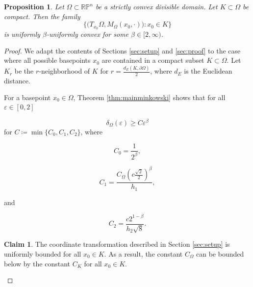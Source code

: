 \documentclass[letterpaper, 11pt, reqno]{amsart}
\newtheorem{prop}[thm]{Proposition}
\theoremstyle{definition}
\newtheorem{claim}[thm]{Claim}
\begin{document}
\begin{prop}Let $\Omega \subset \mathbb{RP}^n$ be a strictly convex divisible domain. Let $K \subset \Omega$ be compact. Then the family 
\begin{equation}
  \biggl\{ \big(T_{x_0}\Omega, M_\Omega(x_0, \cdot)\big): x_0 \in K \biggl\}
\end{equation} is uniformly $\beta$-uniformly convex for some $\beta \in [2, \infty)$.
\end{prop}

\begin{proof}
    We adapt the contents of Sections \ref{sec:setup} and \ref{sec:proof} to the case where all possible basepoints $x_0$ are contained in a compact subset $K \subset \Omega$. Let $K_r$ be the $r$-neighborhood of $K$ for $r = \frac{d_E(K, \partial \Omega)}{2}$, where $d_E$ is the Euclidean distance.


    For a basepoint $x_0 \in \Omega$, Theorem \ref{thm:mainminkowski} shows that for all $\varepsilon \in [0,2]$

    \begin{equation}
     \delta_\Omega(\varepsilon) \geq C\varepsilon^\beta    
    \end{equation}
    for $C \coloneq \min \{C_0, C_1, C_2 \}$, where

    \begin{equation}
        C_0=\frac{1}{2^\beta},
    \end{equation}

        \begin{equation}
        C_1=\frac{C_\Omega(c\frac{\sqrt{2}}{2})^\beta}{h_1},
    \end{equation}

    and

        \begin{equation}
        C_2=\frac{c2^{1-\beta}}{h_2\sqrt{8}}.
    \end{equation}
    
    \begin{claim}\label{uniformshear}
     The coordinate transformation described in Section \ref{sec:setup} is uniformly bounded for all $x_0 \in K$. As a result, the constant $C_\Omega$ can be bounded below by the constant $C_K$ for all $x_0 \in K$.
    \end{claim}


\end{proof}
\end{document}
